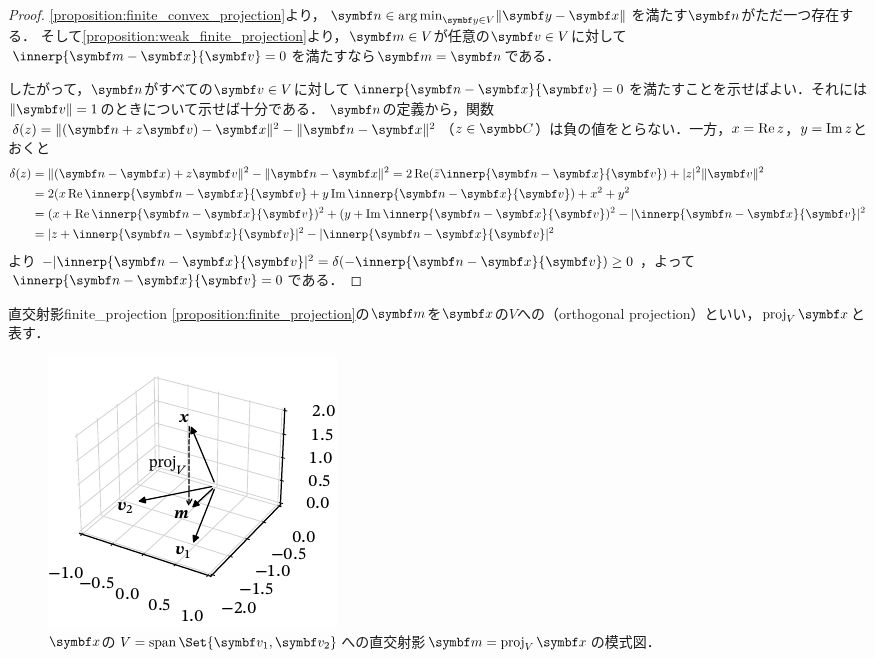 \documentclass[../../main]{subfiles}
\begin{document}
\begin{proof}
  \cref{proposition:finite_convex_projection}より，\(\vect{n}\in\argmin_{\vect{y}\in V}\vnorm{\vect{y}-\vect{x}}\)を満たす\(\vect{n}\)がただ一つ存在する．
  そして\cref{proposition:weak_finite_projection}より，\(\vect{m}\in V\)が任意の\(\vect{v}\in V\)に対して\(\innerp{\vect{m}-\vect{x}}{\vect{v}}=0\)を満たすなら\(\vect{m}=\vect{n}\)である．

  したがって，\(\vect{n}\)がすべての\(\vect{v}\in V\)に対して\(\innerp{\vect{n}-\vect{x}}{\vect{v}}=0\)を満たすことを示せばよい．それには\(\vnorm{\vect{v}}=1\)のときについて示せば十分である．
  \(\vect{n}\)の定義から，関数\(\delta(z)=\vnorm{(\vect{n}+z\vect{v})-\vect{x}}^2-\vnorm{\vect{n}-\vect{x}}^2\)（\(z\in\numset{C}\)）は負の値をとらない．一方，\(x=\operatorname{Re} z\)，\(y=\operatorname{Im} z\)とおくと
  \begin{align*}
    \delta(z) &= \vnorm{(\vect{n}-\vect{x})+z\vect{v}}^2-\vnorm{\vect{n}-\vect{x}}^2
    = 2\rpart(\conj{z}\innerp{\vect{n}-\vect{x}}{\vect{v}})+\abs{z}^2\vnorm{\vect{v}}^2 \\
    &= 2(x\rpart\innerp{\vect{n}-\vect{x}}{\vect{v}}+y\ipart\innerp{\vect{n}-\vect{x}}{\vect{v}})+x^2+y^2 \\
    &= (x+\rpart\innerp{\vect{n}-\vect{x}}{\vect{v}})^2+(y+\ipart\innerp{\vect{n}-\vect{x}}{\vect{v}})^2-\abs{\innerp{\vect{n}-\vect{x}}{\vect{v}}}^2 \\
    &= \abs{z+\innerp{\vect{n}-\vect{x}}{\vect{v}}}^2-\abs{\innerp{\vect{n}-\vect{x}}{\vect{v}}}^2
  \end{align*}
  より\(-\abs{\innerp{\vect{n}-\vect{x}}{\vect{v}}}^2=\delta(-\innerp{\vect{n}-\vect{x}}{\vect{v}})\geq 0\)，よって\(\innerp{\vect{n}-\vect{x}}{\vect{v}}=0\)である．
\end{proof}

\begin{definition}{直交射影}{finite_projection}
  \cref{proposition:finite_projection}の\(\vect{m}\)を\(\vect{x}\)の\(V\)への（orthogonal projection）といい，\(\proj_V\vect{x}\)と表す．
\end{definition}

\begin{figure}[htbp]
  \centering
  \includegraphics{figures/proj3d.pdf}
  \caption{\(\vect{x}\)の\(V=\spannedby\Set{\vect{v}_1,\vect{v}_2}\)への直交射影\(\vect{m}=\proj_V\vect{x}\)の模式図．}
\end{figure}
\end{document}
